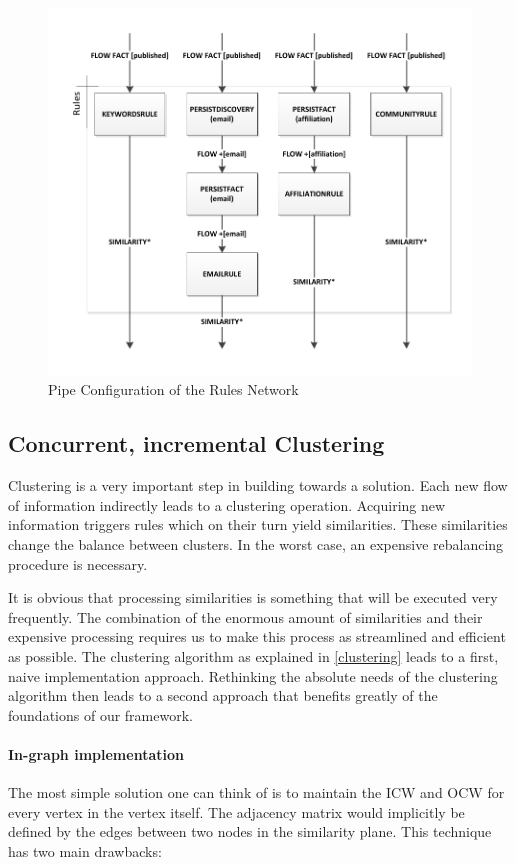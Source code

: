 \begin{figure}[htb]
	\centering
		\includegraphics[width=1\textwidth]{fig/rulespipe}
	\caption{Pipe Configuration of the Rules Network}
	\label{fig:rulespipe}
\end{figure}

\subsection{Concurrent, incremental Clustering}

Clustering is a very important step in building towards a solution. Each new flow of information indirectly leads to a clustering operation. Acquiring new information triggers rules which on their turn yield similarities. These similarities change the balance between clusters. In the worst case, an expensive rebalancing procedure is necessary.

It is obvious that processing similarities is something that will be executed very frequently. The combination of the enormous amount of similarities and their expensive processing requires us to make this process as streamlined and efficient as possible. The clustering algorithm as explained in \autoref{clustering} leads to a first, naive implementation approach. Rethinking the absolute needs of the clustering algorithm then leads to a second approach that benefits greatly of the foundations of our framework.

\paragraph{In-graph implementation} The most simple solution one can think of is to maintain the ICW and OCW for every vertex in the vertex itself. The adjacency matrix would implicitly be defined by the edges between two nodes in the similarity plane. This technique has two main drawbacks:

